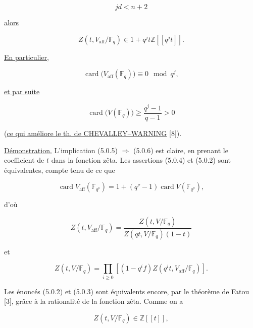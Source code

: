 \begin{equation}\tag{5.0.7}
jd<n+2
\end{equation}

\underline{alors}

\begin{equation}\tag{5.0.5}
Z(t,V_{\mathrm{aff}}/\mathbb F_q)
\in1+q^jt\mathbb Z[[q^jt]].
\end{equation}

\underline{En particulier},

\begin{equation}\tag{5.0.6}
\operatorname{card}\bigl(V_{\mathrm{aff}}(\mathbb F_q)\bigr)
\equiv0\mod{q^j},
\end{equation}

\underline{et par suite}

\begin{equation}\tag{5.0.6 bis}
\operatorname{card}\bigl(V(\mathbb F_q)\bigr)
\geq\frac{q^j-1}{q-1}>0
\end{equation}

\noindent
(\underline{ce qui améliore le th. de CHEVALLEY--WARNING} [8]).


\underline{Démonstration.}
L'implication (5.0.5) $\Rightarrow$ (5.0.6) est claire, en prenant le
coefficient de $t$ dans la fonction zêta. Les assertions (5.0.4) et (5.0.2)
sont équivalentes, compte tenu de ce que

\begin{equation}\tag{5.0.7}
\operatorname{card}V_{\mathrm{aff}}(\mathbb F_{q^\nu})
=1+(q^\nu-1)\operatorname{card}V(\mathbb F_{q^\nu}),
\end{equation}

d'où

\begin{equation}\tag{5.0.8}
Z(t,V_{\mathrm{aff}}/\mathbb F_q)
=\frac{Z(t,V/\mathbb F_q)}
{Z(qt,V/\mathbb F_q)(1-t)}
\end{equation}

et

\begin{equation}\tag{5.0.9}
Z(t,V/\mathbb F_q)
=\prod_{i\geq0}\left[(1-q^if)
Z(q^it,V_{\mathrm{aff}}/\mathbb F_q)\right].
\end{equation}

Les énoncés (5.0.2) et (5.0.3) sont équivalents encore, par le théorème de
Fatou [3], grâce à la rationalité de la fonction zêta. Comme on a

\begin{equation}\tag{5.0.10}
Z(t,V/\mathbb F_q)\in\mathbb Z[[t]],
\end{equation}

